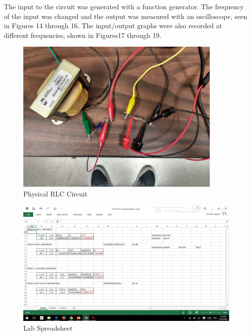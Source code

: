 \documentclass[12pt]{article}
\begin{document}
The input to the circuit was generated with a function generator. The frequency of the input was changed and the output was measured with an oscilloscope, seen in Figures 14 through 16. The input/output graphs were also recorded at different frequencies, shown in Figures17 through 19.

\begin{figure}[h!] %
   \centering
   \includegraphics[width=4in]{real_circuit.jpg} 
   \caption{Physical RLC Circuit}
   \label{fig:example}
\end{figure}

\newpage

\begin{figure}[h!] %
   \centering
   \includegraphics[width=\linewidth]{SpreadSheetFinal.jpg} 
   \caption{Lab Spreadsheet}
   \label{fig:example}
\end{figure}
\bigskip
\end{document}
